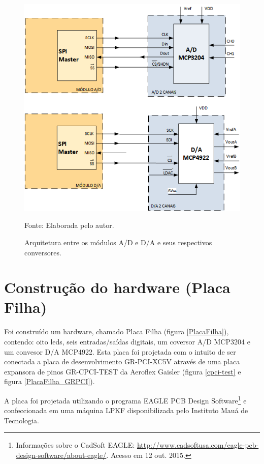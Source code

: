 \begin{figure}[!htb]
	\centering
	\caption{Arquitetura entre os módulos A/D e D/A e seus respectivos conversores.}
	\includegraphics[scale = 0.9]{Imagens/Arch_conversores}
	
	Fonte: Elaborada pelo autor.
	
	\label{Arch_conversores}
\end{figure}


\vfill

\section{Construção do hardware (Placa Filha)}

Foi construído um hardware, chamado Placa Filha (figura \ref{PlacaFilha}), contendo: oito leds, seis entradas/saídas digitais, um coversor A/D MCP3204 e um convesor D/A MCP4922. Esta placa foi projetada com o intuito de ser conectada a placa de desenvolvimento GR-PCI-XC5V através de uma placa expansora de pinos GR-CPCI-TEST da Aeroflex Gaisler (figura \ref{cpci-test} e figura \ref{PlacaFilha_GRPCI}).

A placa foi projetada utilizando o programa EAGLE PCB Design Software\footnote{Informações sobre o CadSoft EAGLE: \url{http://www.cadsoftusa.com/eagle-pcb-design-software/about-eagle/}. Acesso em 12 out. 2015.} e confeccionada em uma máquina LPKF disponibilizada pelo Instituto Mauá de Tecnologia.

